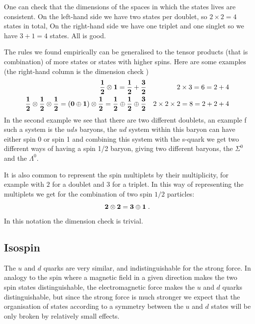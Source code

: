 \documentclass[12pt]{article}
\begin{document}
  One can check that the dimensions of the spaces in which the states lives are consistent. On the left-hand side we have two states per doublet, so $2\times 2=4$ states in total, On the right-hand side we have one triplet and one singlet so we have $3+1=4$ states. All is good.

  The rules we found empirically can be generalised to the tensor products (that is combination) of more states or states with higher spins. Here are some examples (the right-hand column is the dimension check )
  \begin{eqnarray*}
    {\bf \frac{1}{2}}\otimes {\bf 1}={\bf \frac{1}{2}}+{\bf \frac{3}{2}} &&2\times 3 =6= 2+4\\
    {\bf \frac{1}{2}}\otimes{\bf \frac{1}{2}}\otimes{\bf \frac{1}{2}}=({\bf 0}\oplus {\bf 1})\otimes{\bf \frac{1}{2}}={\bf \frac{1}{2}}\oplus{\bf \frac{1}{2}}\oplus{\bf \frac{3}{2}}&& 2\times2\times2=8=2+2+4
  \end{eqnarray*}
  In the second example we see that there are two different doublets, an example f such a system is the $uds$ baryons, the $ud$ system within this baryon can have either spin 0 or spin 1 and combining this system with the s-quark we get two different ways of having a spin 1/2 baryon, giving two different baryons, the $\Sigma^0$ and the $\Lambda^0$.

  It is also common to represent the spin multiplets by their multiplicity, for example with $2$ for a doublet and $3$ for a triplet. In this way of representing the multiplets we get for the combination of two spin $1/2$ particles:
  \[{\bf 2}\otimes {\bf 2} = {\bf 3}\oplus {\bf 1}\;.\]
  In this notation the dimension check is trivial.

  
\subsection{Isospin}
The $u$ and $d$ quarks are very similar, and indistinguishable for the strong force. In analogy to the spin where a magnetic field in a given direction makes the two spin states distinguishable, the electromagnetic force makes the $u$ and $d$ quarks distinguishable, but since the strong force is much stronger we expect that the organisation of states according to a symmetry between the $u$ and $d$ states will be only broken by relatively small effects.
\end{document}
